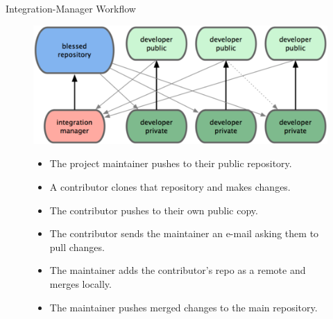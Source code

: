 \documentclass{beamer}
\begin{document}
\begin{frame}{Integration-Manager Workflow}
\begin{figure} 
\centering
\includegraphics{images/integration-manager-workflow.png}
\begin{itemize}
\pause \item The project maintainer pushes to their public repository.
\pause \item A contributor clones that repository and makes changes.
\pause \item The contributor pushes to their own public copy.
\pause \item The contributor sends the maintainer an e-mail asking them to pull changes.
\pause \item The maintainer adds the contributor’s repo as a remote and merges locally.
\pause \item The maintainer pushes merged changes to the main repository.
\end{itemize}
\end{figure}
\end{frame}
\end{document}
